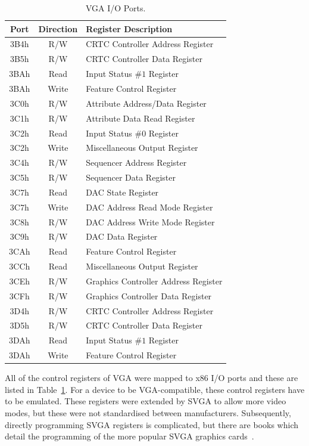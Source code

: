 \begin{table}[h!]
\begin{center}
\begin{tabular}{c | c l}
Port & Direction & Register Description \\
\hline
3B4h & R/W & CRTC Controller Address Register \\
3B5h & R/W & CRTC Controller Data Register \\
3BAh & Read & Input Status $\#1$ Register \\
3BAh & Write & Feature Control Register \\
3C0h & R/W & Attribute Address/Data Register \\
3C1h & R/W & Attribute Data Read Register \\
3C2h & Read & Input Status $\#0$ Register \\
3C2h & Write & Miscellaneous Output Register \\
3C4h & R/W & Sequencer Address Register \\
3C5h & R/W & Sequencer Data Register \\
3C7h & Read & DAC State Register \\
3C7h & Write & DAC Address Read Mode Register \\
3C8h & R/W & DAC Address Write Mode Register \\
3C9h & R/W & DAC Data Register \\
3CAh & Read & Feature Control Register \\
3CCh & Read & Miscellaneous Output Register \\
3CEh & R/W & Graphics Controller Address Register \\
3CFh & R/W & Graphics Controller Data Register \\
3D4h & R/W & CRTC Controller Address Register \\
3D5h & R/W & CRTC Controller Data Register \\
3DAh & Read & Input Status $\#1$ Register \\
3DAh & Write & Feature Control Register \\
\end{tabular}
\end{center}
\caption[VGA I/O Ports]{VGA I/O Ports.}
\label{PCI_VGA_Port_Table}
\end{table}

All of the control registers of VGA were mapped to x86 I/O ports and these are
listed in Table~\ref{PCI_VGA_Port_Table}. For a device to be VGA-compatible,
these control registers have to be emulated. These registers were extended by
SVGA to allow more video modes, but these were not standardised between
manufacturers. Subsequently, directly programming SVGA registers is complicated,
but there are books which detail the programming of the more popular SVGA
graphics cards~\cite{SVGA_Book, VGA_Programmers}.


